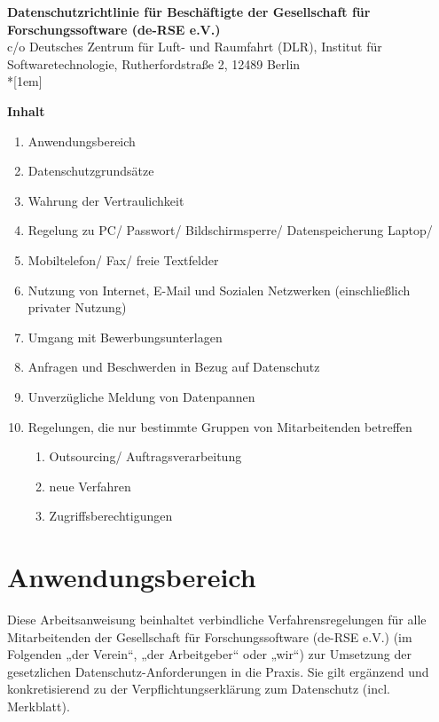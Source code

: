 \documentclass[a4paper, fontsize=11pt]{scrartcl}
\begin{document}
\thispagestyle{headings}
\vspace{-8.5cm}
\begin{centering}
{\large\textbf{Datenschutzrichtlinie für Beschäftigte der Gesellschaft für Forschungssoftware (de-RSE e.V.)}}\\
{\tiny c/o Deutsches Zentrum für Luft- und Raumfahrt (DLR), Institut für Softwaretechnologie, Rutherfordstraße 2, 12489 Berlin}\\*[1em]
\end{centering}
\vspace{0.5cm}
{\large\textbf{Inhalt}} \\
\begin{enumerate}
    \item Anwendungsbereich
    \item Datenschutzgrundsätze
    \item Wahrung der Vertraulichkeit
    \item Regelung zu PC/ Passwort/ Bildschirmsperre/ Datenspeicherung Laptop/
    \item Mobiltelefon/ Fax/ freie Textfelder
    \item Nutzung von Internet, E-Mail und Sozialen Netzwerken (einschließlich privater Nutzung)
    \item Umgang mit Bewerbungsunterlagen
    \item Anfragen und Beschwerden in Bezug auf Datenschutz
    \item Unverzügliche Meldung von Datenpannen
    \item Regelungen, die nur bestimmte Gruppen von Mitarbeitenden betreffen
    \begin{enumerate}
        \item Outsourcing/ Auftragsverarbeitung
        \item neue Verfahren
        \item Zugriffsberechtigungen
    \end{enumerate} 
\end{enumerate}

\vspace{0.5cm}

\section{Anwendungsbereich}
Diese Arbeitsanweisung beinhaltet verbindliche Verfahrensregelungen für alle Mitarbeitenden der Gesellschaft für Forschungssoftware (de-RSE e.V.) (im Folgenden „der Verein“, „der Arbeitgeber“ oder „wir“) zur Umsetzung der gesetzlichen Datenschutz-Anforderungen in die Praxis. Sie gilt ergänzend und konkretisierend zu der Verpflichtungserklärung zum Datenschutz (incl. Merkblatt).
\end{document}
